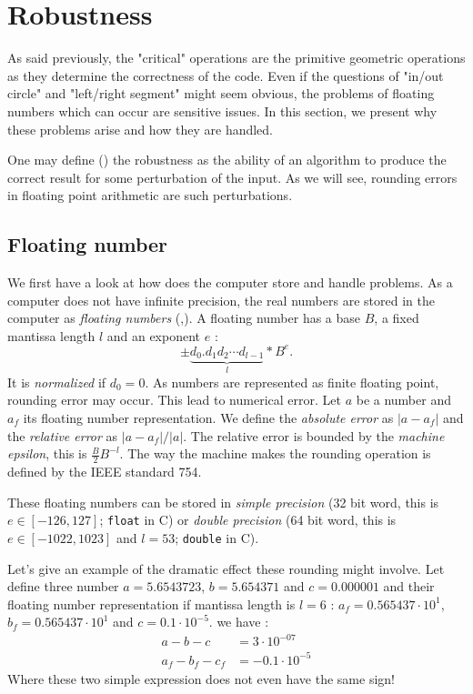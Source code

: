 \section{Robustness}
As said previously, the "critical" operations are the primitive geometric operations as they determine the correctness of the code. Even if the questions of "in/out circle" and "left/right segment" might seem obvious, the problems of floating numbers which can occur are sensitive issues. In this section, we present why these problems arise and how they are handled.

One may define (\cite{schirra}) the robustness as the ability of an algorithm to produce the correct result for some perturbation of the input. As we will see, rounding errors in floating point arithmetic are such perturbations.

\subsection{Floating number}
We first have a look at how does the computer store and handle problems. As a computer does not have infinite precision, the real numbers are stored in the computer as \textit{floating numbers} (\cite{VLegat},\cite{schirra}). A floating number has a base $B$, a fixed mantissa length $l$ and an exponent $e$ : 
\begin{equation*}
± \underbrace{d_0.d_1 d_2 \cdots d_{l-1}}_l * B^e.
\end{equation*}
It is \textit{normalized} if $d_0=0$. As numbers are represented as finite floating point, rounding error may occur. This lead to numerical error. Let $a$ be a number and $a_f$ its floating number representation. We define the \textit{absolute error} as $|a-a_f|$ and the \textit{relative error} as $|a-a_f|/|a|$. The relative error is bounded by the \textit{machine epsilon}, this is $\frac{B}{2} B^{-l}$. The way the machine makes the rounding operation is defined by the IEEE standard 754.

These floating numbers can be stored in \textit{simple precision} (32 bit word, this is $e\in [-126,127]$; \texttt{float} in C) or \textit{double precision} (64 bit word, this is $e\in [-1022,1023]$ and $l=53$; \texttt{double} in C).

Let's give an example of the dramatic effect these rounding might involve. Let define three number $a=5.6543723$, $b=5.654371$ and $c=0.000001$ and their floating number representation if mantissa length is $l=6$ : $a_f=0.565437 \cdot 10^1$, $b_f=0.565437 \cdot 10^1$ and $c=0.1 \cdot 10^{-5}$. we have : 
\begin{align*}
a-b-c &= 3 \cdot 10^{-07} \\
a_f - b_f - c_f &= - 0.1 \cdot 10^{-5}
\end{align*} 
Where these two simple expression does not even have the same sign!

